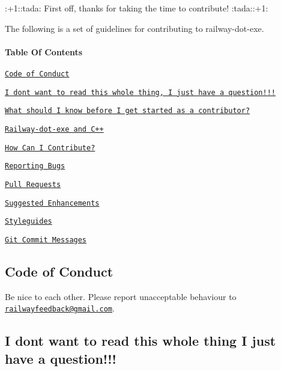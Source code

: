 \+:+1\+::tada\+: First off, thanks for taking the time to contribute! \+:tada\+:\+:+1\+:

The following is a set of guidelines for contributing to railway-\/dot-\/exe.

\paragraph*{Table Of Contents}

\href{#code-of-conduct}{\tt Code of Conduct}

\href{#i-dont-want-to-read-this-whole-thing-i-just-have-a-question}{\tt I don\textquotesingle{}t want to read this whole thing, I just have a question!!!}

\href{#what-should-i-know-before-i-get-started-as-a-contributor}{\tt What should I know before I get started as a contributor?}
\begin{DoxyItemize}
\item \href{#railway-dot-exe-and-c++}{\tt Railway-\/dot-\/exe and C++}
\end{DoxyItemize}

\href{#how-can-i-contribute}{\tt How Can I Contribute?}
\begin{DoxyItemize}
\item \href{#reporting-bugs}{\tt Reporting Bugs}
\item \href{#pull-requests}{\tt Pull Requests}
\item \href{#suggested-enhancements}{\tt Suggested Enhancements}
\end{DoxyItemize}

\href{#styleguides}{\tt Styleguides}
\begin{DoxyItemize}
\item \href{#git-commit-messages}{\tt Git Commit Messages}
\end{DoxyItemize}

\subsection*{Code of Conduct}

Be nice to each other. Please report unacceptable behaviour to \href{mailto:railwayfeedback@gmail.com}{\tt railwayfeedback@gmail.\+com}.

\subsection*{I don\textquotesingle{}t want to read this whole thing I just have a question!!!}

